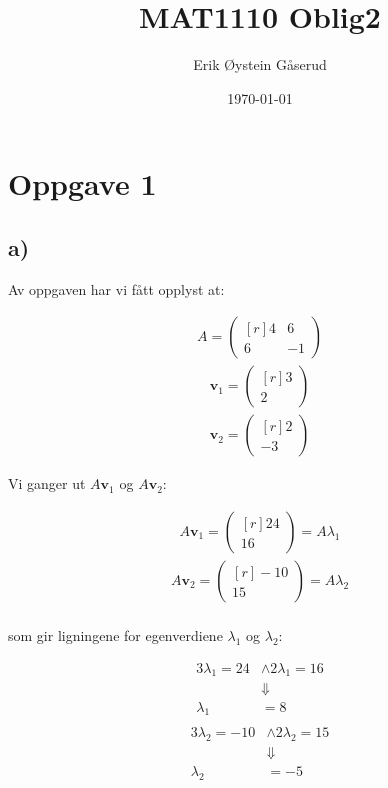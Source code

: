 \documentclass[11pt]{article}
\title{MAT1110 Oblig2}
\author{Erik Øystein Gåserud}
\date{\today}
\renewcommand{\vec}[1]{\mathbf{#1}}
\newcommand{\bpm}{\begin{pmatrix*}[r]}
\newcommand{\epm}{\end{pmatrix*}}
\begin{document}
	\maketitle
	\section*{Oppgave 1}
	\subsection*{a)}
	Av oppgaven har vi fått opplyst at:
	\begin{multicols}{3} \noindent
		\begin{align*}
			A = \bpm 4 & 6 \\ 6 & -1 \epm
		\end{align*}
		\begin{align*}
			\vec{v}_{1} = \bpm 3 \\ 2 \epm
		\end{align*}
		\begin{align*}
			\vec{v}_{2} = \bpm 2 \\ -3 \epm
		\end{align*}
	\end{multicols}
	Vi ganger ut $A\vec{v}_{1}$ og $A\vec{v}_{2}$:
	\begin{multicols}{2} \noindent
		\begin{align*}
			A\vec{v}_{1} = \bpm 24 \\ 16 \epm = A\lambda_{1}
		\end{align*}
		\begin{align*}
			A\vec{v}_{2} = \bpm -10 \\ 15 \epm = A\lambda_{2}\\
		\end{align*}
	\end{multicols}
		som gir ligningene for egenverdiene $\lambda_{1}$ og $\lambda_{2}$:
	\begin{multicols}{2} \noindent
		\begin{align*}
			3\lambda_{1} = 24&\wedge2\lambda_{1} = 16 \\
			&\Downarrow \\
			\lambda_{1} &= 8 \\
		\end{align*}
		\begin{align*}
			3\lambda_{2} = -10&\wedge2\lambda_{2} = 15 \\
			&\Downarrow \\
			\lambda_{2} &= -5\\
		\end{align*}
	\end{multicols}
\end{document}
